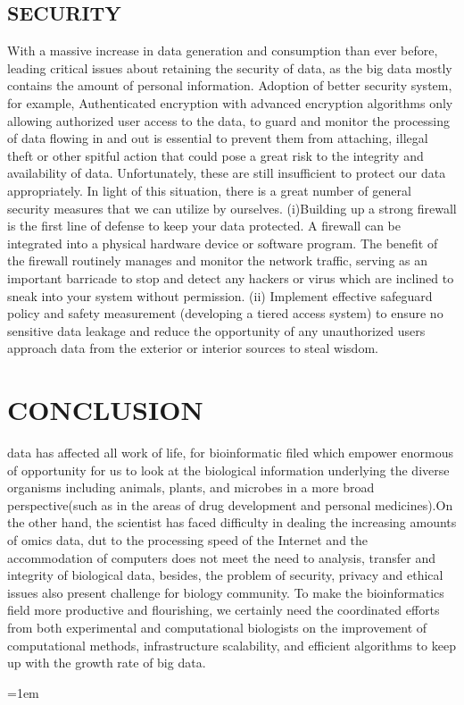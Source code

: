 \documentclass[12pt]{article}
\begin{document}
\subsection{SECURITY}
With a massive increase in data generation and consumption than ever before, leading critical issues about retaining the security of data, as the big data mostly contains the amount of personal information. Adoption of better security system, for example, Authenticated encryption with advanced encryption algorithms only allowing authorized user access to the data, to guard and monitor the processing of data flowing in and out is essential to prevent them from attaching, illegal theft or other spitful action that could pose a great risk to the integrity and availability of data. Unfortunately, these are still insufficient to protect our data appropriately. In light of this situation, there is a great number of general security measures that we can utilize by ourselves.
(i)Building up a strong firewall is the first line of defense to keep your data protected. A firewall can be integrated into a physical hardware device or software program. The benefit of the firewall routinely manages and monitor the network traffic, serving as an important barricade to stop and detect any hackers or virus which are inclined to sneak into your system without permission.
(ii) Implement effective safeguard policy and safety measurement (developing a tiered access system) to ensure no sensitive data leakage and reduce the opportunity of any unauthorized users approach data from the exterior or interior sources to steal wisdom.

 
\section{CONCLUSION}
data has affected all work of life, for bioinformatic filed which empower enormous of opportunity for us to look at the biological information underlying the diverse organisms including animals, plants, and microbes in a  more broad perspective(such as in the areas of drug development and personal medicines).On the other hand, the scientist has faced difficulty in dealing the increasing amounts of omics data, dut to the processing speed of the Internet and the accommodation of computers does not meet the need to analysis, transfer and integrity of biological data, besides, the problem of security, privacy and ethical issues also present challenge for biology community. To make the bioinformatics field more productive and flourishing, we certainly need the coordinated efforts from both experimental and computational biologists on the improvement of computational methods, infrastructure scalability, and efficient algorithms to keep up with the growth rate of big data.

\medskip


\emergencystretch=1em
\printbibliography[title=Reference]
\end{document}
